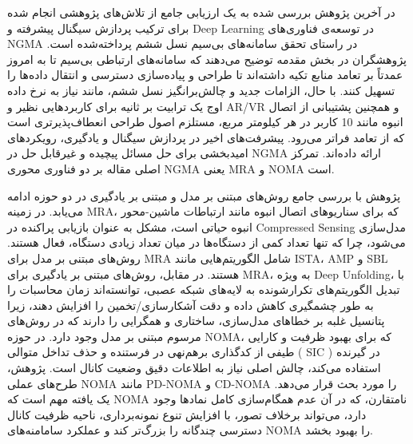 در آخرین پژوهش بررسی شده به یک ارزیابی جامع از تلاش‌های پژوهشی انجام شده برای ترکیب پردازش سیگنال پیشرفته و 
\gls{Deep Learning}
 در توسعه‌ی فناوری‌های 
\gls{NGMA}
  در راستای تحقق سامانه‌های بی‌سیم نسل ششم پرداخته‌شده است.
پژوهشگران در بخش مقدمه توضیح می‌دهند که سامانه‌های ارتباطی بی‌سیم تا به امروز عمدتاً بر تعامد منابع تکیه داشته‌اند تا طراحی و پیاده‌سازی دسترسی و انتقال داده‌ها را تسهیل کنند. با  حال، الزامات جدید و چالش‌برانگیز نسل ششم، مانند نیاز به نرخ داده اوج یک ترابیت بر ثانیه برای کاربردهایی نظیر و
\gls{AR}/\gls{VR}
 و همچنین پشتیبانی از اتصال انبوه مانند 10 
کاربر در هر کیلومتر مربع، مستلزم اصول طراحی انعطاف‌پذیرتری است که از تعامد فراتر می‌رود. پیشرفت‌های اخیر در پردازش سیگنال و یادگیری، رویکردهای امیدبخشی برای حل  مسائل پیچیده و غیرقابل حل در 
\gls{NGMA}
 ارائه داده‌اند. تمرکز اصلی  مقاله بر دو فناوری محوری 
\gls{NGMA}
  یعنی  
\gls{MRA}
   و
\gls{NOMA}
   است.
   
پژوهش با بررسی جامع روش‌های مبتنی بر مدل و مبتنی بر یادگیری در  دو حوزه ادامه می‌یابد. در زمینه 
\gls{MRA}،
 که برای سناریوهای اتصال انبوه مانند ارتباطات ماشین-محور انبوه حیاتی است، مشکل به عنوان بازیابی پراکنده در 
\gls{Compressed Sensing}
  مدل‌سازی می‌شود، چرا که تنها تعداد کمی از دستگاه‌ها در میان تعداد زیادی دستگاه، فعال هستند. روش‌های مبتنی بر مدل برای 
\gls{MRA}
   شامل الگوریتم‌هایی مانند 
\gls{ISTA}، 
\gls{AMP}
    و 
\gls{SBL}
     هستند. در مقابل، روش‌های مبتنی بر یادگیری برای 
\gls{MRA}،
 به ویژه 
\gls{Deep Unfolding}،
    با تبدیل الگوریتم‌های تکرارشونده به لایه‌های شبکه عصبی، توانسته‌اند زمان محاسبات را به طور چشمگیری کاهش داده و دقت آشکارسازی/تخمین را افزایش دهند، زیرا پتانسیل غلبه بر خطاهای مدل‌سازی، ساختاری و همگرایی را دارند که در روش‌های مرسوم مبتنی بر مدل وجود دارد.
در حوزه 
\gls{NOMA}،
 که برای بهبود ظرفیت و کارایی طیفی از کدگذاری برهم‌نهی در فرستنده و حذف تداخل متوالی (
\gls{SIC}
 ) در گیرنده استفاده می‌کند، چالش اصلی نیاز به اطلاعات دقیق وضعیت کانال است.  پژوهش، طرح‌های عملی 
\gls{NOMA}
  مانند 
\gls{PD-NOMA}
   و 
\gls{CD-NOMA}
   را مورد بحث قرار می‌دهد. یک یافته مهم است که 
\gls{NOMA}
    نامتقارن، که در آن عدم همگام‌سازی کامل نمادها وجود دارد، می‌تواند برخلاف تصور، با افزایش تنوع نمونه‌برداری، ناحیه ظرفیت کانال دسترسی چندگانه را بزرگ‌تر کند و عملکرد سامامنه‌های 
\gls{NOMA}
     را بهبود بخشد.
     
